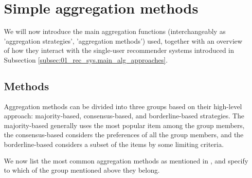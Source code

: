 \section{Simple aggregation methods}\label{sec:03_simple_aggregation_metods}
We will now introduce the main aggregation functions (interchangeably as 'aggregation strategies', 'aggregation methods') used, together with an overview of how they interact with the single-user recommender systems introduced in Subsection \ref{subsec:01_rec_sys.main_alg_approaches}.

\subsection{Methods}\label{subsec:03_simple_aggregation_methods.methods}

Aggregation methods can be divided into three groups based on their high-level approach: majority-based, consensus-based, and borderline-based strategies. The majority-based generally uses the most popular item among the group members, the consensus-based considers the preferences of all the group members, and the borderline-based considers a subset of the items by some limiting criteria.

We now list the most common aggregation methods as mentioned in \cite{grouprecommendersystems_felfernig2018group}, \cite{masthoff_2011_group_rec_systems} and \cite{masthoff_2004_group_modeling} specify to which of the group mentioned above they belong.

